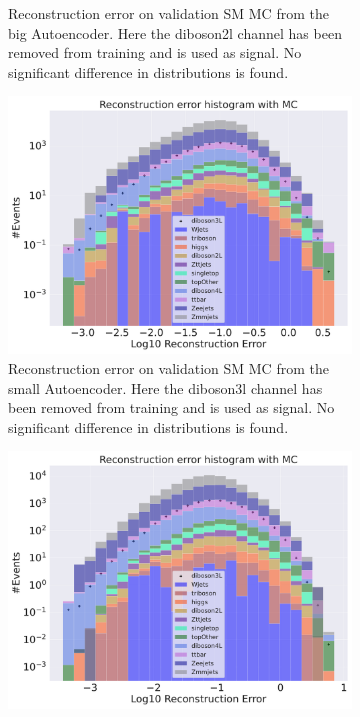 \begin{figure}[H]
\begin{subfigure}{.45\textwidth}
        \caption{Reconstruction error on validation SM MC from the big Autoencoder. Here the diboson2l channel has been removed from training and 
        is used as signal. No significant difference in distributions is found. }
        \label{fig:vae_big_diboson2l}
    \end{subfigure}
    \hfill 
    \begin{subfigure}{.45\textwidth}
        \includegraphics[width=\textwidth]{Figures/VAE_testing/small/b_data_recon_big_rm3_feats_sig_diboson3l.pdf}
        \caption{Reconstruction error on validation SM MC from the small Autoencoder. Here the diboson3l channel has been removed from training and 
        is used as signal. No significant difference in distributions is found. }
        \label{fig:vae_small_diboson3l}
    \end{subfigure}
    \hfill
    \begin{subfigure}{.45\textwidth}
        \includegraphics[width=\textwidth]{Figures/VAE_testing/big/b_data_recon_big_rm3_feats_sig_diboson3l.pdf}

\end{subfigure}
\end{figure}
